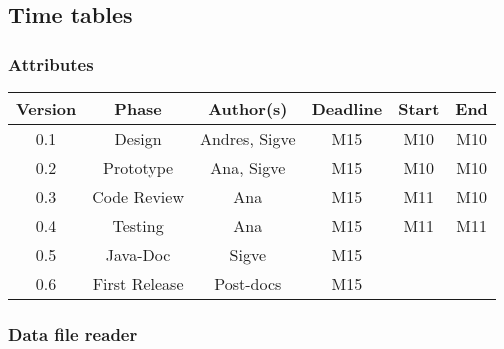\newpage
\subsection{Time tables}

\subsubsection*{Attributes}

\begin{table}[H]
\begin{tabular}{cccccc}
\hline
\textbf{Version} & \textbf{Phase} & \textbf{Author(s)} & \textbf{Deadline} & \textbf{Start} & \textbf{End}\\
\hline
0.1 & Design & Andres, Sigve & M15 & M10 & M10\\
\hline 
0.2 & Prototype & Ana, Sigve & M15 & M10 & M10\\
\hline 
0.3 & Code Review & Ana & M15 & M11 & M10\\
\hline 
0.4 & Testing & Ana& M15 & M11 & M11\\
\hline 
0.5 & Java-Doc  & Sigve & M15 &  & \\
\hline 
0.6 & First Release & Post-docs & M15 &  & \\
\hline
\end{tabular}
\end{table}

\subsubsection*{Data file reader}

